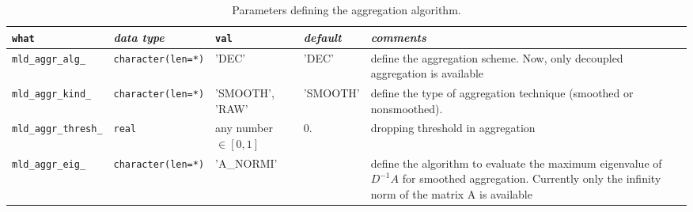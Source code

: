 \begin{sidewaystable}
\begin{center}
\begin{tabular}{|l|l|p{2cm}|l|p{7cm}|}
\hline
\verb|what|              & \emph{data type}        &  \verb|val|      &  \emph{default}  &
\emph{comments} \\ \hline
\verb|mld_aggr_alg_|     & \verb|character(len=*)|
                         & 'DEC'
                         & 'DEC'
                         & define the aggregation scheme. Now, only decoupled aggregation is available\\
\verb|mld_aggr_kind_|    & \verb|character(len=*)|
                         & 'SMOOTH', 'RAW'
                         & 'SMOOTH'
                         & define the type of aggregation technique (smoothed or nonsmoothed).    \\
\verb|mld_aggr_thresh_|  & \verb|real|
                         & any number $\in [0, 1]$
                         & 0.
                         & dropping threshold in aggregation    \\
\verb|mld_aggr_eig_|     & \verb|character(len=*)|
                         & 'A\_NORMI'
                         &
                         & define the algorithm to evaluate the maximum eigenvalue of $D^{-1}A$ for smoothed
aggregation. Currently only the infinity norm of the matrix A is available\\
\hline
\end{tabular}
\end{center}
\caption{Parameters defining the aggregation algorithm.
\label{tab:p_aggregation}} 
\end{sidewaystable}
                     
